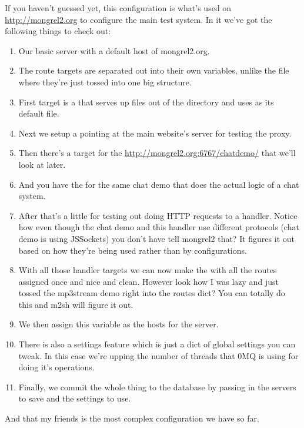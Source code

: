 If you haven't guessed yet, this configuration is what's used on \url{http://mongrel2.org}
to configure the main test system.  In it we've got the following things to check out:

\begin{enumerate}
\item Our basic server with a default host of mongrel2.org.
\item The route targets are separated out into their own variables, unlike the  file
    where they're just tossed into one big structure.
\item First target is a  that serves up files out of the  directory and uses 
    as its default file.
\item Next we setup a  pointing at the main website's server for testing the proxy.
\item Then there's a  target for the \url{http://mongrel2.org:6767/chatdemo/} that we'll look at later.
\item And you have the  for the same chat demo that does the actual logic of a chat system.
\item After that's a little  for testing out doing HTTP requests to a handler.  Notice how even
    though the chat demo and this handler use different protocols (chat demo is using JSSockets) you don't have
    tell mongrel2 that?  It figures it out based on how they're being used rather than by configurations.
\item With all those handler targets we can now make the   with all the routes
    assigned once and nice and clean.  However look how I was lazy and just tossed the mp3stream demo
    right into the routes dict?  You can totally do this and m2sh will figure it out.
\item We then assign this  variable as the hosts for the  server.
\item There is also a settings feature which is just a dict of global settings you can tweak.  In this case
    we're upping the number of threads that 0MQ is using for doing it's operations.
\item Finally, we commit the whole thing to the database by passing in the servers to save and the settings
    to use.
\end{enumerate}

And that my friends is the most complex configuration we have so far.


